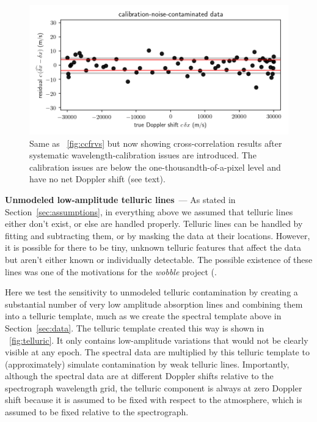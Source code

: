 \documentclass[modern]{aastex631}
\renewcommand{\paragraph}[1]{\bigskip\noindent\textbf{#1}~---}
\newcommand{\sectionname}{Section}
\newcommand{\secref}[1]{\sectionname~\ref{#1}}
\newcommand{\figref}[1]{\figurename~\ref{#1}}
\begin{document}
\begin{figure}[tp]
  \begin{mdframed}
    \begin{center}
    \includegraphics[width=\textwidth]{../notebook/calibration.png}
    \end{center}
    \caption{Same as \figref{fig:ccfrvs} but now showing cross-correlation results after systematic wavelength-calibration issues are introduced. The calibration issues are below the one-thousandth-of-a-pixel level and have no net Doppler shift (see text).\label{fig:calibration}}
  \end{mdframed}
\end{figure}

\paragraph{Unmodeled low-amplitude telluric lines}
As stated in \secref{sec:assumptions}, in everything above we assumed that telluric lines either don't exist, or else are handled properly.
Telluric lines can be handled by fitting and subtracting them, or by masking the data at their locations.
However, it is possible for there to be tiny, unknown telluric features that affect the data but aren't either known or individually detectable.
The possible existence of these lines was one of the motivations for the \textsl{wobble} project (\citealt{wobble)}.

Here we test the sensitivity to unmodeled telluric contamination by creating a substantial number of very low amplitude absorption lines and combining them into a telluric template, much as we create the spectral template above in \secref{sec:data}.
The telluric template created this way is shown in \figref{fig:telluric}.
It only contains low-amplitude variations that would not be clearly visible at any epoch.
The spectral data are multiplied by this telluric template to (approximately) simulate contamination by weak telluric lines.
Importantly, although the spectral data are at different Doppler shifts relative to the spectrograph wavelength grid, the telluric component is always at zero Doppler shift because it is assumed to be fixed with respect to the atmosphere, which is assumed to be fixed relative to the spectrograph.
\end{document}
